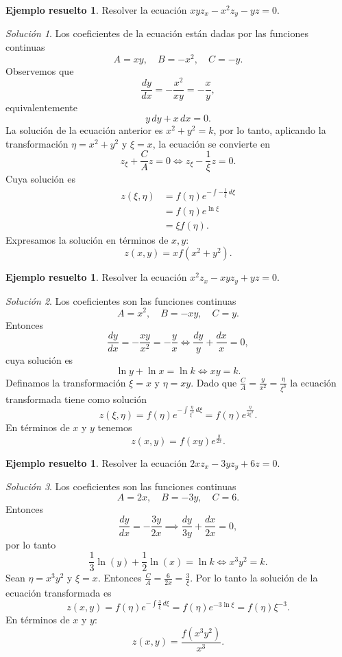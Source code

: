 \documentclass[11pt,letterpaper,draft]{report}
\theoremstyle{plain}
\theoremstyle{definition}
\newtheorem{solved}[theorem]{Ejemplo resuelto}
\theoremstyle{remark}
\newtheorem*{solution}{Solución}
\newcommand\<{\langle}
\renewcommand\>{\rangle}
\begin{document}
\begin{solved}
  Resolver la ecuación $xy z_x - x^2 z_y - yz = 0$.
  \begin{solution}
    Los coeficientes de la ecuación están dadas por las
    funciones continuas
    \[
    A = xy, \quad B = -x^2, \quad C = -y.
    \] 
    Observemos que
    \[
    \frac{dy}{dx} = -\frac{x^2}{xy} = -\frac{x}{y},
    \] 
    equivalentemente
    \[
    y \, dy + x \, dx = 0.
    \] 
    La solución de la ecuación anterior es $x^2 + y^2 = k$,
    por lo tanto, aplicando la transformación $\eta = x^2 +
    y^2$ y $\xi = x$, la ecuación se convierte en
    \[
    z_\xi + \frac{C}{A} z = 0 \iff z_\xi - \frac{1}{\xi} z =
    0.
    \]
    Cuya solución es
    \begin{align*}
      z(\xi,\eta) &= f(\eta)e^{-\int -\frac{1}{\xi} \,
      d\xi}\\
                  &= f(\eta)e^{\ln \xi}\\
                  &= \xi f(\eta).
    \end{align*} 
    Expresamos la solución en términos de $x,y$: 
    \[
      z(x,y) = xf(x^2+y^2).
    \] 
  \end{solution}
\end{solved}

\begin{solved}
  Resolver la ecuación $x^2 z_x - xy z_y + yz = 0.$
  \begin{solution}
    Los coeficientes son las funciones continuas
    \[
    A = x^2, \quad B = -xy, \quad C = y.
    \] 
    Entonces
    \[
    \frac{dy}{dx} = -\frac{xy}{x^2} = -\frac{y}{x} \iff
    \frac{dy}{y} + \frac{dx}{x} = 0,
    \] 
    cuya solución es
    \[
    \ln y + \ln x = \ln k \iff xy = k.
    \]
    Definamos la transformación $\xi = x$ y $\eta = xy$.
    Dado que $\frac{C}{A} = \frac{y}{x^2} =
    \frac{\eta}{\xi^3}$ la ecuación transformada tiene como
    solución
    \[
    z(\xi,\eta) = f(\eta)e^{-\int \frac{\eta}{\xi^3} \, d\xi} =
    f(\eta)e^{\frac{\eta}{2\xi^2}}.
    \] 
    En términos de $x$ y $y$ tenemos
    \[
    z(x,y) = f(xy)e^{\frac{y}{2x}}.
    \] 
  \end{solution}
\end{solved}

\begin{solved}
  Resolver la ecuación $2x z_x - 3y z_y + 6z = 0$.
  \begin{solution}
    Los coeficientes son las funciones continuas
    \[
    A = 2x, \quad B = -3y, \quad C = 6.
    \] 
    Entonces
    \[
    \frac{dy}{dx} = -\frac{3y}{2x} \implies \frac{dy}{3y} +
    \frac{dx}{2x} = 0,
    \]
    por lo tanto
    \[
    \frac{1}{3}\ln(y) + \frac{1}{2}\ln(x) = \ln k \iff
    x^3y^2 = k.
    \] 
    Sean $\eta = x^3 y^2$ y $\xi = x$. Entonces $\frac{C}{A}
    = \frac{6}{2x} = \frac{3}{\xi}$. Por lo tanto la
    solución de la ecuación transformada es
    \[
    z(x,y) = f(\eta)e^{-\int \frac{3}{\xi} \, d\xi} =
    f(\eta)e^{-3\ln \xi} = f(\eta) \xi^{-3}.
    \] 
    En términos de $x$ y $y$:
    \[
    z(x,y) = \frac{f(x^3y^2)}{x^3}.
    \] 
  \end{solution}
\end{solved}
\end{document}
